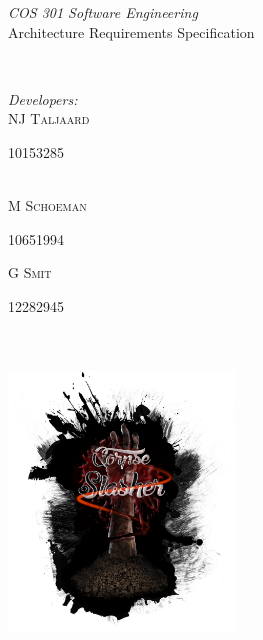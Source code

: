 \documentclass[letterpaper]{article}
\makeatletter
\def\printauthor{%
    {\large \@author}}
\makeatother
\begin{document}
\begin{titlepage}
\begin{center}
\begin{minipage}{0.4\textwidth}
\begin{flushleft} \large
\emph{COS 301 Software Engineering}\\
\vspace{1cm}
Architecture Requirements Specification
\end{flushleft}
\end{minipage}
~
\begin{minipage}{0.4\textwidth}
	\begin{flushright} \large
	\emph{Developers:} \\
		NJ \textsc{Taljaard} \\
			\begin{small}
				10153285
			\end{small} \\
		M  \textsc{Schoeman} \\
			\begin{small}
				10651994 \\
			\end{small}
		G  \textsc{Smit} \\
			\begin{small}
				12282945
			\end{small}
	\end{flushright}
\end{minipage}\\



\includegraphics[width=60mm, height=80mm]{corpseslasher.png}\\ %
 
\end{center}
\vfill %

\end{titlepage}
\end{document}

